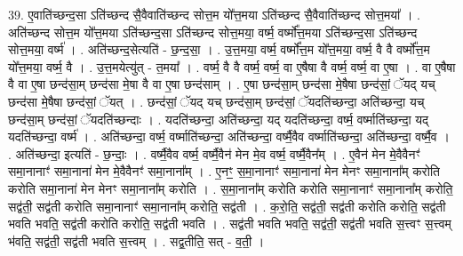 \documentclass[17pt]{extarticle}
\begin{document}
39. ए॒वाति॑च्छन्द॒सा ऽति॑च्छन्द सै॒वैवाति॑च्छन्द सोत्त॒म यो᳚त्त॒मया ऽति॑च्छन्द सै॒वैवाति॑च्छन्द सोत्त॒मया᳚ । . अति॑च्छन्द सोत्त॒म यो᳚त्त॒मया ऽति॑च्छन्द॒सा ऽति॑च्छन्द सोत्त॒मया॒ वर्ष्म॒ वर्ष्मो᳚त्त॒मया ऽति॑च्छन्द॒सा ऽति॑च्छन्द सोत्त॒मया॒ वर्ष्म॑ । . अति॑च्छन्द॒सेत्यति॑ - छ॒न्द॒सा॒ । . उ॒त्त॒मया॒ वर्ष्म॒ वर्ष्मो᳚त्त॒म यो᳚त्त॒मया॒ वर्ष्म॒ वै वै वर्ष्मो᳚त्त॒म यो᳚त्त॒मया॒ वर्ष्म॒ वै । . उ॒त्त॒मयेत्यु॑त् - त॒मया᳚ । . वर्ष्म॒ वै वै वर्ष्म॒ वर्ष्म॒ वा ए॒षैषा वै वर्ष्म॒ वर्ष्म॒ वा ए॒षा । . वा ए॒षैषा वै वा ए॒षा छन्द॑सा॒म् छन्द॑सा मे॒षा वै वा ए॒षा छन्द॑साम् । . ए॒षा छन्द॑सा॒म् छन्द॑सा मे॒षैषा छन्द॑सां॒ ॅयद् यच् छन्द॑सा मे॒षैषा छन्द॑सां॒ ॅयत् । . छन्द॑सां॒ ॅयद् यच् छन्द॑सा॒म् छन्द॑सां॒ ॅयदति॑च्छन्दा॒ अति॑च्छन्दा॒ यच् छन्द॑सा॒म् छन्द॑सां॒ ॅयदति॑च्छन्दाः । . यदति॑च्छन्दा॒ अति॑च्छन्दा॒ यद् यदति॑च्छन्दा॒ वर्ष्म॒ वर्ष्माति॑च्छन्दा॒ यद् यदति॑च्छन्दा॒ वर्ष्म॑ । . अति॑च्छन्दा॒ वर्ष्म॒ वर्ष्माति॑च्छन्दा॒ अति॑च्छन्दा॒ वर्ष्मै॒वैव वर्ष्माति॑च्छन्दा॒ अति॑च्छन्दा॒ वर्ष्मै॒व । . अति॑च्छन्दा॒ इत्यति॑ - छ॒न्दाः॒ । . वर्ष्मै॒वैव वर्ष्म॒ वर्ष्मै॒वैन॑ मेन मे॒व वर्ष्म॒ वर्ष्मै॒वैन᳚म् । . ए॒वैन॑ मेन मे॒वैवैनꣳ॑ समा॒नानाꣳ॑ समा॒नाना॑ मेन मे॒वैवैनꣳ॑ समा॒नाना᳚म् । . ए॒नꣳ॒॒ स॒मा॒नानाꣳ॑ समा॒नाना॑ मेन मेनꣳ समा॒नाना᳚म् करोति करोति समा॒नाना॑ मेन मेनꣳ समा॒नाना᳚म् करोति । . स॒मा॒नाना᳚म् करोति करोति समा॒नानाꣳ॑ समा॒नाना᳚म् करोति॒ सद्व॑ती॒ सद्व॑ती करोति समा॒नानाꣳ॑ समा॒नाना᳚म् करोति॒ सद्व॑ती । . क॒रो॒ति॒ सद्व॑ती॒ सद्व॑ती करोति करोति॒ सद्व॑ती भवति भवति॒ सद्व॑ती करोति करोति॒ सद्व॑ती भवति । . सद्व॑ती भवति भवति॒ सद्व॑ती॒ सद्व॑ती भवति स॒त्त्वꣳ स॒त्त्वम् भ॑वति॒ सद्व॑ती॒ सद्व॑ती भवति स॒त्त्वम् । . सद्व॒तीति॒ सत् - व॒ती॒ । \newline
\pagebreak
{}
\end{document}
